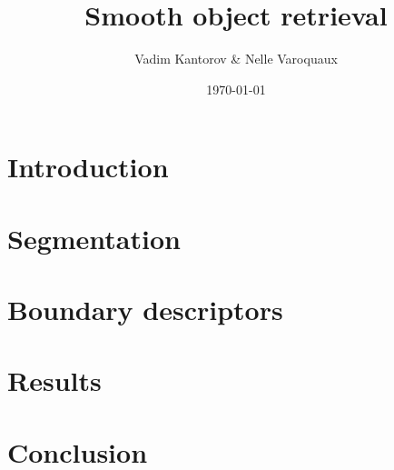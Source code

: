 \documentclass{article}
\date{\today}
\title{Smooth object retrieval}
\author{Vadim Kantorov \& Nelle Varoquaux}
\begin{document}
\maketitle
\begin{abstract}

\end{abstract}

\section{Introduction}
\section{Segmentation}
\section{Boundary descriptors}
\section{Results}
\section{Conclusion}


\end{document}
